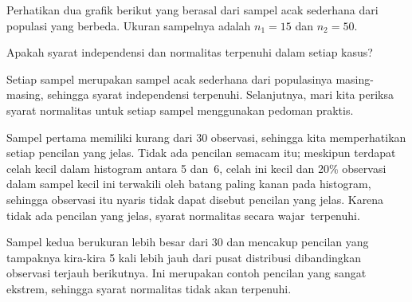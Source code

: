 \begin{examplewrap}
\begin{nexample}{Perhatikan dua grafik berikut
    yang berasal dari sampel acak sederhana dari
    populasi yang berbeda.
    Ukuran sampelnya adalah $n_1 = 15$ dan $n_2 = 50$.
    \begin{center}
    \end{center}
    Apakah syarat independensi dan normalitas terpenuhi
    dalam setiap kasus?}
  \label{outliers_and_ss_condition_ex}%
  Setiap sampel merupakan sampel acak sederhana dari
  populasinya masing-masing, sehingga syarat independensi
  terpenuhi.
  Selanjutnya, mari kita periksa syarat normalitas untuk
  setiap sampel menggunakan pedoman praktis.
  
  Sampel pertama memiliki kurang dari 30 observasi,
  sehingga kita memperhatikan setiap pencilan yang jelas.
  Tidak ada pencilan semacam itu; meskipun terdapat celah kecil dalam
  histogram antara 5 dan~6, celah ini kecil dan
  20\% observasi dalam sampel kecil ini
  terwakili oleh batang paling kanan pada histogram,
  sehingga observasi itu nyaris tidak dapat disebut pencilan yang jelas.
  Karena tidak ada pencilan yang jelas, syarat normalitas
  secara wajar~terpenuhi.

  Sampel kedua berukuran lebih besar dari 30 dan
  mencakup pencilan yang tampaknya kira-kira 5 kali
  lebih jauh dari pusat distribusi dibandingkan
  observasi terjauh berikutnya.
  Ini merupakan contoh pencilan yang sangat ekstrem,
  sehingga syarat normalitas tidak akan terpenuhi.
\end{nexample}
\end{examplewrap}
